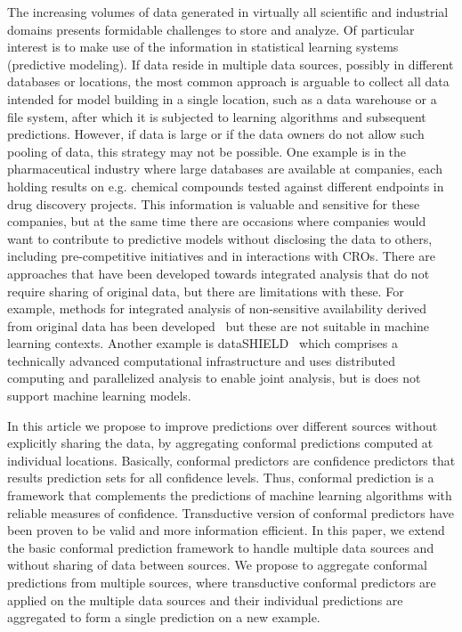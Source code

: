 \documentclass[main]{subfiles}
\newcommand{\todo}[1]{{\color{blue} #1 }}
\begin{document}
The increasing volumes of data generated in virtually all scientific and industrial domains presents formidable challenges to store and analyze. Of particular interest is to make use of the information in statistical learning systems (predictive modeling). If data reside in multiple data sources, possibly in different databases or locations, the most common approach is arguable to collect all data intended for model building in a single location, such as a data warehouse or a file system, after which it is subjected to learning algorithms and subsequent predictions. However, if data is large or if the data owners do not allow such pooling of data, this strategy may not be possible. One example is in the pharmaceutical industry where large databases are available at companies, each holding results on e.g. chemical compounds tested against different endpoints in drug discovery projects. This information is valuable and sensitive for these companies, but at the same time there are occasions where companies would want to contribute to predictive models without disclosing the data to others, including pre-competitive initiatives and in interactions with CROs. There are approaches that have been developed towards integrated analysis that do not require sharing of original data, but there are limitations with these. For example, methods for integrated analysis of non-sensitive availability derived from original data has been developed~\cite{Spjuth:2016ly} but these are not suitable in machine learning contexts. Another example is dataSHIELD~\citep{Gaye:2014sf} which comprises a technically advanced computational infrastructure and uses distributed computing and parallelized analysis to enable joint analysis, but is does not support machine learning models. %
 
In this article we propose to improve predictions over different sources without explicitly sharing the data, by aggregating conformal predictions computed at individual locations. 
Basically, conformal predictors are confidence predictors that results prediction sets for all confidence levels. Thus, conformal prediction is a framework that complements the predictions of machine learning algorithms with reliable measures of confidence.
Transductive version of conformal predictors have been proven to be valid and more information efficient. In this paper, we extend the basic conformal prediction framework to handle multiple data sources and without sharing of data between sources. We propose to aggregate conformal predictions from multiple sources, where transductive conformal predictors are applied on the multiple data sources and their individual predictions are aggregated to form a single prediction on a new example.
\end{document}

